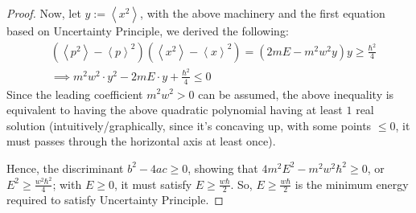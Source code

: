 \documentclass{article}
\begin{document}
\begin{proof}
    \hfil

    Now, let $y:= \left<x^2\right>$, with the above machinery and the first equation based on Uncertainty Principle, we derived the following:
    \begin{align}
        &\left(\left<p^2\right>-\left<p\right>^2\right)\left(\left<x^2\right>-\left<x\right>^2\right) = (2mE-m^2w^2 y)y\geq \frac{\hbar^2}{4}\\
        &\implies m^2w^2\cdot y^2-2mE\cdot y + \frac{\hbar^2}{4}\leq 0
    \end{align}
    Since the leading coefficient $m^2w^2>0$ can be assumed, the above inequality is equivalent to having the above quadratic polynomial having at least $1$ real solution (intuitively/graphically, since it's concaving up, with some points $\leq 0$, it must passes through the horizontal axis at least once).

    Hence, the discriminant $b^2-4ac\geq 0$, showing that $4m^2E^2 - m^2w^2\hbar^2 \geq 0$, or $E^2\geq \frac{w^2\hbar^2}{4}$; with $E\geq 0$, it must satisfy $E\geq \frac{w\hbar}{2}$. So, $E\geq \frac{w\hbar}{2}$ is the minimum energy required to satisfy Uncertainty Principle.

\end{proof}
\end{document}
